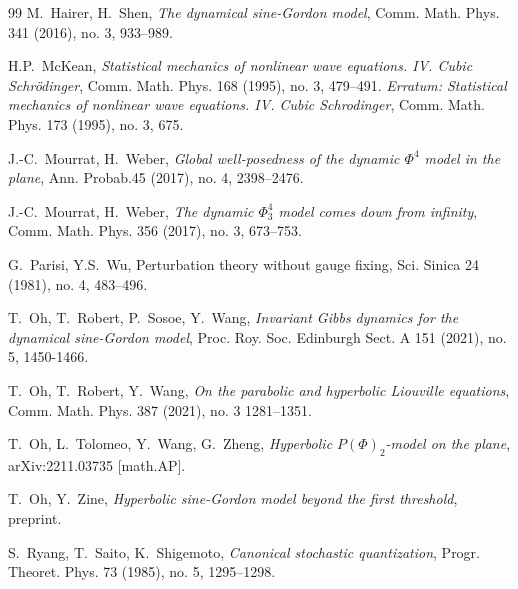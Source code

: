 \documentclass[letterpaper, 11pt,  reqno]{amsart}
\theoremstyle{myremark}
\newcommand{\1}{\hspace{0.5mm}\text{I}\hspace{0.5mm}}
\numberwithin{equation}{section}
\numberwithin{theorem}{section}
\begin{document}
\begin{thebibliography}{99}
M.~Hairer, H.~Shen,
{\it The dynamical sine-Gordon model}, Comm. Math. Phys. 341 (2016), no. 3, 933--989. 




H.P.~McKean, 
{\it Statistical mechanics of nonlinear wave equations. IV. Cubic Schr\"odinger}, Comm. Math.
Phys. 168 (1995), no. 3, 479--491. 
{\it Erratum: Statistical mechanics of nonlinear wave equations. IV. Cubic
Schrodinger}, Comm. Math. Phys. 173 (1995), no. 3, 675.




J.-C.~Mourrat, H.~Weber,
{\it Global well-posedness of the dynamic $\Phi^4$ model in the plane},
Ann. Probab.45 (2017), no. 4, 2398–2476.



J.-C.~Mourrat, H.~Weber,
{\it The dynamic $\Phi^4_3$ model comes down from infinity},
Comm. Math. Phys. 356 (2017), no. 3, 673--753.




G.~Parisi, Y.S.~Wu, 
{Perturbation theory without gauge fixing},
Sci. Sinica 24 (1981), no. 4, 483--496.




T.~Oh, T.~Robert, P.~Sosoe, Y.~Wang,
{\it Invariant Gibbs dynamics for the dynamical sine-Gordon model},
Proc. Roy. Soc. Edinburgh Sect. A 151 (2021), no. 5, 1450-1466.

T.~Oh, T.~Robert, Y.~Wang,
{\it  On the parabolic and hyperbolic Liouville equations},
 Comm. Math. Phys. 387 (2021), no. 3 1281--1351. 


T.~Oh, L.~Tolomeo, Y.~Wang, G.~Zheng,
{\it  Hyperbolic $P(\Phi)_2$-model on the plane},
arXiv:2211.03735 [math.AP].



T.~Oh, Y.~Zine,
{\it  Hyperbolic sine-Gordon model beyond the first threshold},
preprint.

S.~Ryang, T.~Saito, K.~Shigemoto,
{\it Canonical stochastic quantization},
Progr. Theoret. Phys. 73 (1985), no. 5, 1295--1298. 





\end{thebibliography}
\end{document}

